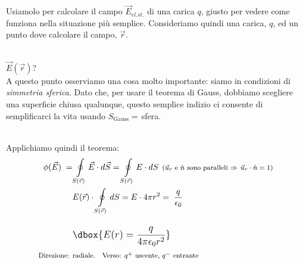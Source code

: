 \documentclass[a4paper,12pt,titlepage,openany]{book}
\theoremstyle{mydef}
\newcommand\dboxed[1]{\mathlarger{\dbox{\ensuremath{#1}}}}  %
\begin{document}
            Usiamolo per calcolare il campo $\vec{E}_{el.st.}$ di una carica $q$, giusto per vedere come funziona nella situazione più semplice. Consideriamo quindi una
            carica, $q$, ed un punto dove calcolare il campo, $\vec{r}$.\\
            \\
            $\vec{E}(\vec{r})$?\\
            A questo punto osserviamo una cosa molto importante: siamo in condizioni di \emph{simmetria sferica}. Dato che, per usare il teorema di Gauss, dobbiamo
            scegliere una superficie chiusa qualunque, questo semplice indizio ci consente di semplificarci la vita usando $S_{\text{Gauss}}=\,$sfera.\\[1em]
            \\
            Applichiamo quindi il teorema:
            \begin{align*}
                \phi(\vec{E}) \;= &\oint\limits_{S(\vec{r})}\vec{E}\cdot\mathop{d\vec{S}} = \oint\limits_{S(\vec{r})}E\cdot\mathop{dS}\;
                \mbox{\footnotesize ($\vec{u}_r$ e $\hat{n}$ sono paralleli $\Rightarrow\,\vec{u}_r \cdot \hat{n} = 1$)}\\
                &E(\vec{r})\cdot\oint\limits_{S(\vec{r})}\mathop{dS} = E\cdot4\pi r^2 = \;\frac{q}{\epsilon_0}\\[1em]
                &\dboxed{E(r) = \frac{q}{4\pi\epsilon_0 r^2}}\\
                \mbox{\footnotesize Direzione: }& \mbox{\footnotesize radiale.\quad Verso: $q^+$ uscente, $q^-$ entrante}
            \end{align*}
            
\end{document}
